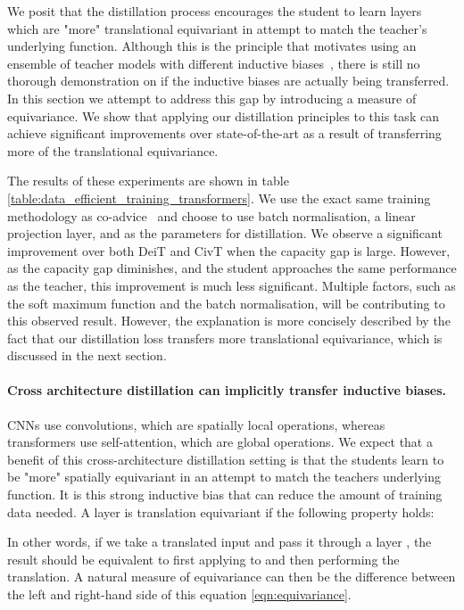 \documentclass[letterpaper]{article} \usepackage[submission]{aaai23}  \usepackage{times}  \usepackage{helvet}  \usepackage{courier}  \usepackage[hyphens]{url}  \usepackage{graphicx} \urlstyle{rm} \def\UrlFont{\rm}  \usepackage{natbib}  \usepackage{caption} \frenchspacing  \setlength{\pdfpagewidth}{8.5in} \setlength{\pdfpageheight}{11in} \usepackage{algorithm}
\begin{document}
We posit that the distillation process encourages the student to learn layers which are "more" translational equivariant in attempt to match the teacher's underlying function. Although this is the principle that motivates using an ensemble of teacher models with different inductive biases~\cite{Ren2022Co-advise:Distillation}, there is still no thorough demonstration on if the inductive biases are actually being transferred. In this section we attempt to address this gap by introducing a measure of equivariance. We show that applying our distillation principles to this task can achieve significant improvements over state-of-the-art as a result of transferring more of the translational equivariance.

The results of these experiments are shown in table \ref{table:data_efficient_training_transformers}. We use the exact same training methodology as co-advice~\cite{Ren2022Co-advise:Distillation} and choose to use batch normalisation, a linear projection layer, and  as the parameters for distillation. We observe a significant improvement over both DeiT and CivT when the capacity gap is large. However, as the capacity gap diminishes, and the student approaches the same performance as the teacher, this improvement is much less significant. Multiple factors, such as the soft maximum function and the batch normalisation, will be contributing to this observed result. However, the explanation is more concisely described by the fact that our distillation loss transfers more translational equivariance, which is discussed in the next section.

\paragraph{Cross architecture distillation can implicitly transfer inductive biases.} CNNs use convolutions, which are spatially local operations, whereas transformers use self-attention, which are global operations. We expect that a benefit of this cross-architecture distillation setting is that the students learn to be "more" spatially equivariant in an attempt to match the teachers underlying function. It is this strong inductive bias that can reduce the amount of training data needed. A layer is translation equivariant if the following property holds:



In other words, if we take a translated input  and pass it through a layer , the result should be equivalent to first applying  to  and then performing the translation. A natural measure of equivariance can then be the difference between the left and right-hand side of this equation \ref{eqn:equivariance}.
\end{document}
